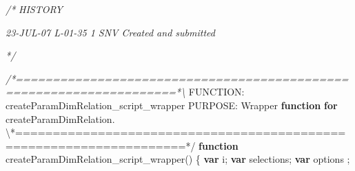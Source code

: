 \documentclass[]{article}
\newenvironment{Shaded}{}{}
\newcommand{\KeywordTok}[1]{\textcolor[rgb]{0.00,0.44,0.13}{\textbf{{#1}}}}
\newcommand{\CommentTok}[1]{\textcolor[rgb]{0.38,0.63,0.69}{\textit{{#1}}}}
\newcommand{\OtherTok}[1]{\textcolor[rgb]{0.00,0.44,0.13}{{#1}}}
\newcommand{\FunctionTok}[1]{\textcolor[rgb]{0.02,0.16,0.49}{{#1}}}
\newcommand{\NormalTok}[1]{{#1}}
\begin{document}
\begin{Shaded}
\begin{Highlighting}[]
\CommentTok{/*  }
\CommentTok{   HISTORY}

\CommentTok{23-JUL-07   L-01-35   $$1  SNV     Created and submitted}

\CommentTok{*/}

\CommentTok{/*====================================================================*\textbackslash{}}
\NormalTok{FUNCTION: createParamDimRelation_script_wrapper}
\NormalTok{PURPOSE:  Wrapper }\KeywordTok{function} \KeywordTok{for} \OtherTok{createParamDimRelation}\NormalTok{.}
\NormalTok{\textbackslash{}*====================================================================*}\OtherTok{/}
\KeywordTok{function} \FunctionTok{createParamDimRelation_script_wrapper}\NormalTok{()}
\NormalTok{\{   }
    \KeywordTok{var} \NormalTok{i;}
    \KeywordTok{var} \NormalTok{selections;}
    \KeywordTok{var} \NormalTok{options ;}
    

\end{Highlighting}
\end{Shaded}
\end{document}
